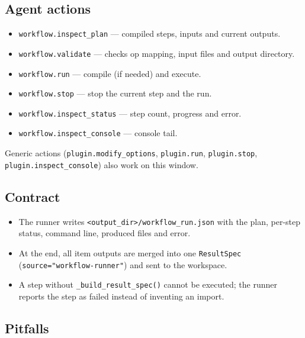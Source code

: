 \documentclass[11pt]{report}
\begin{document}
\subsection{Agent actions}

\begin{itemize}
  \item \texttt{workflow.\allowbreak inspect\_\allowbreak plan} --- compiled steps, inputs and current outputs.
  \item \texttt{workflow.\allowbreak validate} --- checks op mapping, input files and output directory.
  \item \texttt{workflow.\allowbreak run} --- compile (if needed) and execute.
  \item \texttt{workflow.\allowbreak stop} --- stop the current step and the run.
  \item \texttt{workflow.\allowbreak inspect\_\allowbreak status} --- step count, progress and error.
  \item \texttt{workflow.\allowbreak inspect\_\allowbreak console} --- console tail.
\end{itemize}

Generic actions (\texttt{plugin.\allowbreak modify\_\allowbreak options}, \texttt{plugin.\allowbreak run}, \texttt{plugin.\allowbreak stop}, \texttt{plugin.\allowbreak inspect\_\allowbreak console}) also work on this window.

\subsection{Contract}

\begin{itemize}
  \item The runner writes \texttt{<output\_\allowbreak dir>/\allowbreak workflow\_\allowbreak run.\allowbreak json} with the plan, per-step status, command line, produced files and error.
  \item At the end, all item outputs are merged into one \texttt{ResultSpec} (\texttt{source="workflow-runner"}) and sent to the workspace.
  \item A step without \texttt{\_\allowbreak build\_\allowbreak result\_\allowbreak spec\allowbreak ()} cannot be executed; the runner reports the step as failed instead of inventing an import.
\end{itemize}

\subsection{Pitfalls}
\end{document}
